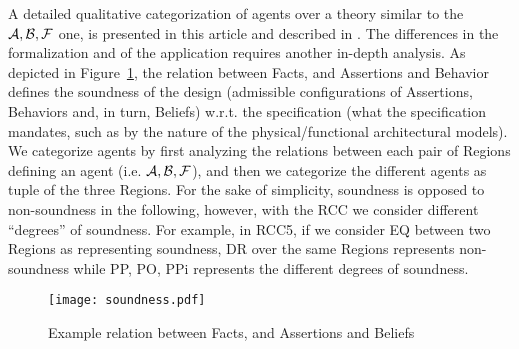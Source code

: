 A detailed qualitative categorization of agents over a theory similar to the
$\mathcal{A},\mathcal{B},\mathcal{F}$ one, is presented in this article and described in
\autocite{Santaca2016abf}. The differences in the formalization and of the
application requires another in-depth analysis. As depicted in
Figure~\ref{fig:soundness}, the relation between Facts, and Assertions and Behavior
defines the soundness of the design (admissible configurations of Assertions,
Behaviors and, in turn, Beliefs) w.r.t. the specification (what the
specification mandates, such as by the nature of the physical/functional
architectural models). We categorize agents by first analyzing the relations
between each pair of Regions defining an agent (i.e. $\mathcal{A},\mathcal{B},\mathcal{F}$), and then we
categorize the different agents as tuple of the three Regions.
For the sake of simplicity, soundness is opposed to non-soundness in the following, however,
with the RCC we consider different ``degrees'' of soundness. For example,
in RCC5, if we consider EQ between two Regions as representing soundness, DR over the same Regions
represents non-soundness while PP, PO, PPi represents the different degrees of soundness.

\begin{figure}[t]
	\centering
	\texttt{[image: soundness.pdf]}
	\caption{Example relation between Facts, and Assertions and Beliefs}
	\label{fig:soundness}
\end{figure}

